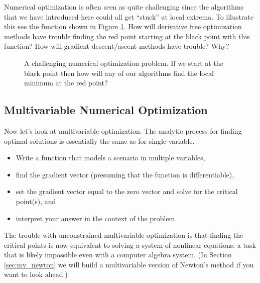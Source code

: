 \begin{problem}
    Numerical optimization is often seen as quite challenging since the algorithms that
    we have introduced here could all get ``stuck'' at local extrema.  To illustrate this
    see the function shown in Figure \ref{fig:num_opt_challenging}.  How will derivative
    free optimization methods have trouble finding the red point starting at the black
    point with this function?  How will gradient
    descent/ascent methods have trouble?  Why?
\end{problem}

\begin{figure}
    \begin{center}
    \end{center}
    \caption{A challenging numerical optimization problem. If we start at the black point
    then how will any of our algorithms find the local minimum at the red point?}
    \label{fig:num_opt_challenging}
\end{figure}


\newpage\subsection{Multivariable Numerical Optimization}
Now let's look at multivariable optimization.  The analytic process for finding optimal
solutions is essentially the same as for single variable.
\begin{itemize}
    \item Write a function that models a scenario in multiple variables,
    \item find the gradient vector (presuming that the function is differentiable),
    \item set the gradient vector equal to the zero vector and solve for the critical point(s), and
    \item interpret your answer in the context of the problem.
\end{itemize}
The trouble with unconstrained multivariable optimization is that finding the critical
points is now equivalent to solving a system of nonlinear equations; a task that is likely
impossible even with a computer algebra system.  (In Section \ref{sec:mv_newton} we will
build a multivariable version of Newton's method if you want to look ahead.)

